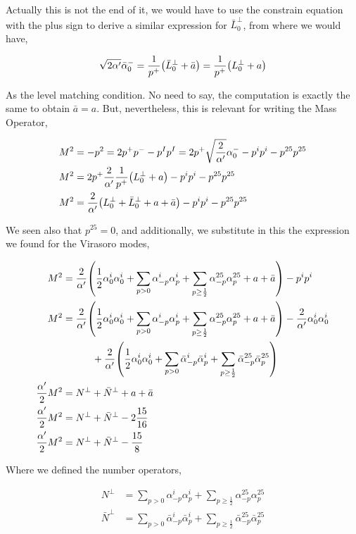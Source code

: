 Actually this is not the end of it, we would have to use the constrain equation with the plus sign to derive a similar expression for ${\bar L}^\perp_0$, 
from where we would have,

\begin{align*}
    \sqrt{2\alpha'}{\bar\alpha}^-_0=\frac{1}{p^+}\qty({\bar L}^\perp_0+\bar a)=\frac{1}{p^+}\qty({ L}^\perp_0+ a)
\end{align*}

As the level matching condition. No need to say, the computation is exactly the same to obtain $\bar a=a$. But, nevertheless, this 
is relevant for writing the Mass Operator,

\begin{align*}
    M^2&=-p^2=2p^+p^--p^Ip^I=2p^+\sqrt{\frac{2}{\alpha'}}\alpha_0^--p^ip^i-p^{25}p^{25}\\
    M^2&=2p^+\frac{2}{\alpha'}\frac{1}{p^+}\qty(L^\perp_0+a)-p^ip^i-p^{25}p^{25}\\
    M^2&=\frac{2}{\alpha'}\qty(L^\perp_0+{\bar L}^\perp_0+a+\bar a)-p^ip^i-p^{25}p^{25}
\end{align*}

We seen also that $p^{25}=0$, and additionally, we substitute in this the expression we found for the Virasoro modes,

\begin{align*}
    M^2&=\frac{2}{\alpha'}\qty(\frac12\alpha_0^i\alpha_0^i+\sum\limits_{p> 0}\alpha^i_{-p}\alpha^i_{p}+\sum\limits_{p\geq\frac12}\alpha^{25}_{-p}\alpha^{25}_{p}+a+\bar a)-p^ip^i\\
    M^2&=\frac{2}{\alpha'}\qty(\frac12\alpha_0^i\alpha_0^i+\sum\limits_{p> 0}\alpha^i_{-p}\alpha^i_{p}+\sum\limits_{p\geq\frac12}\alpha^{25}_{-p}\alpha^{25}_{p}+a+\bar a)-\frac{2}{\alpha'}\alpha_0^i\alpha_0^i\\
    &\quad\quad\quad+\frac{2}{\alpha'}\qty(\frac12\alpha_0^i\alpha_0^i+\sum\limits_{p> 0}{\bar\alpha}^i_{-p}{\bar\alpha}^i_{p}+\sum\limits_{p\geq\frac12}{\bar\alpha}^{25}_{-p}{\bar\alpha}^{25}_{p})\\
    \frac{\alpha'}{2}M^2&=N^\perp+{\bar N}^\perp+a+\bar a\\
    \frac{\alpha'}{2}M^2&=N^\perp+{\bar N}^\perp-2\frac{15}{16}\\
    \frac{\alpha'}{2}M^2&=N^\perp+{\bar N}^\perp-\frac{15}{8}
\end{align*}

Where we defined the number operators,

\begin{align*}
    N^\perp&=\sum\limits_{p> 0}\alpha^i_{-p}\alpha^i_{p}+\sum\limits_{p\geq\frac12}\alpha^{25}_{-p}\alpha^{25}_{p}\\
    {\bar N}^\perp&=\sum\limits_{p> 0}{\bar\alpha}^i_{-p}{\bar\alpha}^i_{p}+\sum\limits_{p\geq\frac12}{\bar\alpha}^{25}_{-p}{\bar\alpha}^{25}_{p}
\end{align*}

